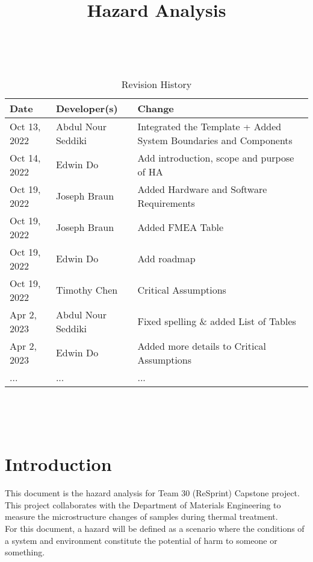 \documentclass{article}
\title{Hazard Analysis\\\progname}
\author{\authname}
\date{}
\begin{document}
\maketitle

~\newpage


\begin{table}[hp]
\caption{Revision History} \label{TblRevisionHistory}
\begin{tabularx}{\textwidth}{llX}
\toprule
\textbf{Date} & \textbf{Developer(s)} & \textbf{Change}\\
\midrule
Oct 13, 2022 & Abdul Nour Seddiki & Integrated the Template + Added System Boundaries and Components\\
Oct 14, 2022 & Edwin Do & Add introduction, scope and purpose of HA \\
Oct 19, 2022 & Joseph Braun & Added Hardware and Software Requirements \\
Oct 19, 2022 & Joseph Braun & Added FMEA Table\\
Oct 19, 2022 & Edwin Do & Add roadmap \\
Oct 19, 2022 & Timothy Chen & Critical Assumptions \\
Apr 2, 2023 & Abdul Nour Seddiki & Fixed spelling \& added List of Tables\\
Apr 2, 2023 & Edwin Do & Added more details to Critical Assumptions\\

... & ... & ...\\
\bottomrule
\end{tabularx}
\end{table}

~\newpage

\tableofcontents
\listoftables

~\newpage



\section{Introduction}
This document is the hazard analysis for Team 30 (ReSprint) Capstone project. 
This project collaborates with the Department of Materials Engineering to measure the microstructure changes of samples during thermal treatment.\\

\noindent For this document, a hazard will be defined as 
a scenario where the conditions of a system and environment constitute the potential of harm to someone or something.
\end{document}
